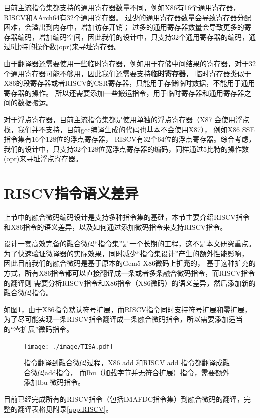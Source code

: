 目前主流指令集都支持的通用寄存器数量不同，例如X86有16个通用寄存器，RISCV和AArch64有32个通用寄存器。
过少的通用寄存器数量会导致寄存器分配困难，会溢出到内存中，增加访存开销；
过多的通用寄存器数量会导致更多的寄存器编码，增加编码空间，因此我们的设计中，只支持32个通用寄存器的编码，通过5比特的操作数(opr)来寻址寄存器。

由于翻译器还需要使用一些临时寄存器，例如用于存储中间结果的寄存器，对于32个通用寄存器可能不够用，因此我们还需要支持\textbf{临时寄存器}，
临时寄存器类似于X86的段寄存器或者RISCV的CSR寄存器，只能用于存储临时数据，不能用于通用寄存器的操作。
所以还需要添加一些搬运指令，用于临时寄存器和通用寄存器之间的数据搬运。

对于浮点寄存器，目前主流指令集都是使用单独的浮点寄存器（X87 会使用浮点栈，我们并不支持，目前gcc编译生成的代码也基本不会使用X87），
例如X86 SSE指令集有16个128位的浮点寄存器，
RISCV有32个64位的浮点寄存器。综合考虑，我们的设计中，只支持32个128位宽浮点寄存器的编码，同样通过5比特的操作数(opr)来寻址浮点寄存器。





\section{RISCV指令语义差异}

上节中的融合微码编码设计是支持多种指令集的基础，本节主要介绍RISCV指令和X86指令的语义差异，以及如何通过添加微码指令来支持RISCV指令。

设计一套高效完备的融合微码“指令集”是一个长期的工程，这不是本文研究重点。
为了快速验证微译器的实际效果，同时减少“指令集设计”产生的额外性能影响，
因此目前我们的融合微码是基于原本的Gem5 X86微码上\textbf{扩充}的，
基于这种扩充的方式，所有X86指令都可以直接翻译成一条或者多条融合微码指令，而RISCV指令的翻译则
需要分析RISCV指令和X86指令（X86微码）的语义差异，然后添加新的融合微码指令。

如图\ref{img:TISA}，由于X86指令默认符号扩展，而RISCV指令同时支持符号扩展和零扩展，
为了尽可能实现一条RISCV指令翻译成一条融合微码指令，所以需要添加适当的“零扩展”微码指令。

\begin{figure}[!htbp]
  \centering
  \texttt{[image: ./image/TISA.pdf]}
  \caption{指令翻译到融合微码过程，X86 add 和RISCV add 指令都翻译成融合微码add指令，
  而lbu（加载字节并无符合扩展）指令，需要额外添加lbu 微码指令。}
  \label{img:TISA}
\end{figure}



目前已经完成所有的RISCV指令（包括IMAFDC指令集）到融合微码的翻译，完整的翻译表格见附录\ref{app:RISCV}。

